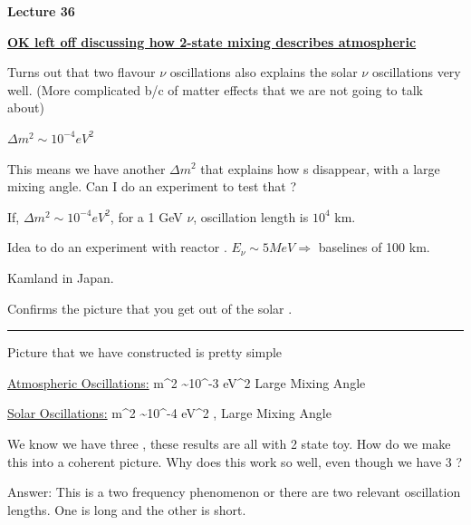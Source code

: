 



\thispagestyle{fancy}

\begin{center}
{\huge \textbf{Lecture 36}}
\end{center}

{\fontsize{14}{16}\selectfont

\textbf{\underline{OK left off discussing how 2-state mixing describes atmospheric \nus}} 

Turns out that two flavour $\nu$ oscillations also explains the solar $\nu$ oscillations very well. 
(More complicated b/c of matter effects that we are not going to talk about)

$\Delta m^2 \sim 10^{-4} eV^2$ 

This means we have another $\Delta m^2$ that explains how \nue s disappear, with a large mixing angle. 
Can I do an experiment to test that ?

If,  $\Delta m^2 \sim 10^{-4} eV^2$,  for a 1 GeV $\nu$, oscillation length is $10^4$ km. 

Idea to do an experiment with reactor \nus.
$E_\nu \sim 5 MeV \Rightarrow $ baselines of 100 km. 

Kamland in Japan.

Confirms the picture that you get out of the solar \nus.

\noindent\rule{\textwidth}{1pt}

Picture that we have constructed is pretty simple

\underline{Atmospheric Oscillations:}
\be
\Delta m^2 \sim 10^{-3} eV^2
\ee
\be
\numu \longleftrightarrow \nutau
\ee
\bc
Large Mixing Angle
\ec

\underline{Solar Oscillations:}
\be
\Delta m^2 \sim 10^{-4} eV^2
\ee
\be
\nue \longleftrightarrow \numu,\nutau
\ee
\bc
Large Mixing Angle
\ec

We know we have three \nus, these results are all with 2 state toy. 
How do we make this into a coherent picture. 
Why does this work so well, even though we have 3 \nus?

Answer:
This is a two frequency phenomenon or there are two relevant oscillation lengths.
One is long and the other is short. 

}
